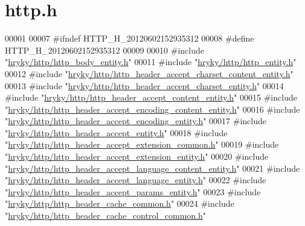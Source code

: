 \hypertarget{http_8h_source}{\section{http.\-h}
}

\begin{DoxyCode}
00001 
00007 \textcolor{preprocessor}{#ifndef HTTP\_H\_20120602152935312}
00008 \textcolor{preprocessor}{}\textcolor{preprocessor}{#define HTTP\_H\_20120602152935312}
00009 \textcolor{preprocessor}{}
00010 \textcolor{preprocessor}{#include "\hyperlink{http__body__entity_8h}{hryky/http/http_body_entity.h}"}
00011 \textcolor{preprocessor}{#include "\hyperlink{http__entity_8h}{hryky/http/http_entity.h}"}
00012 \textcolor{preprocessor}{#include "\hyperlink{http__header__accept__charset__content__entity_8h}{hryky/http/http_header_accept_charset_content_entity.h}"}
00013 \textcolor{preprocessor}{#include "\hyperlink{http__header__accept__charset__entity_8h}{hryky/http/http_header_accept_charset_entity.h}"}
00014 \textcolor{preprocessor}{#include "\hyperlink{http__header__accept__content__entity_8h}{hryky/http/http_header_accept_content_entity.h}"}
00015 \textcolor{preprocessor}{#include "\hyperlink{http__header__accept__encoding__content__entity_8h}{hryky/http/http_header_accept_encoding_content_entity.h}"}
00016 \textcolor{preprocessor}{#include "\hyperlink{http__header__accept__encoding__entity_8h}{hryky/http/http_header_accept_encoding_entity.h}"}
00017 \textcolor{preprocessor}{#include "\hyperlink{http__header__accept__entity_8h}{hryky/http/http_header_accept_entity.h}"}
00018 \textcolor{preprocessor}{#include "\hyperlink{http__header__accept__extension__common_8h}{hryky/http/http_header_accept_extension_common.h}"}
00019 \textcolor{preprocessor}{#include "\hyperlink{http__header__accept__extension__entity_8h}{hryky/http/http_header_accept_extension_entity.h}"}
00020 \textcolor{preprocessor}{#include "\hyperlink{http__header__accept__language__content__entity_8h}{hryky/http/http_header_accept_language_content_entity.h}"}
00021 \textcolor{preprocessor}{#include "\hyperlink{http__header__accept__language__entity_8h}{hryky/http/http_header_accept_language_entity.h}"}
00022 \textcolor{preprocessor}{#include "\hyperlink{http__header__accept__params__entity_8h}{hryky/http/http_header_accept_params_entity.h}"}
00023 \textcolor{preprocessor}{#include "\hyperlink{http__header__cache__common_8h}{hryky/http/http_header_cache_common.h}"}
00024 \textcolor{preprocessor}{#include "\hyperlink{http__header__cache__control__common_8h}{hryky/http/http_header_cache_control_common.h}"}

\end{DoxyCode}
